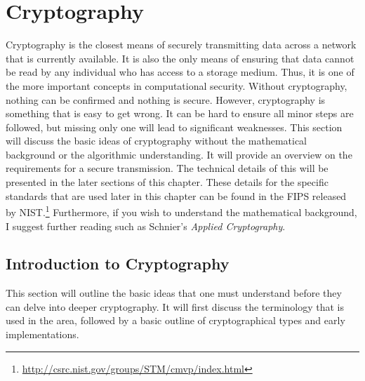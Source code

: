 \chapter{Cryptography}
	\label{ch:Cryptography}
		Cryptography is the closest means of securely transmitting data across a network that is currently available. 
		It is also the only means of ensuring that data cannot be read by any individual who has access to a storage medium. 
		Thus, it is one of the more important concepts in computational security. 
		Without cryptography, nothing can be confirmed and nothing is secure. 
		However, cryptography is something that is easy to get wrong.
		It can be hard to ensure all minor steps are followed, but missing only one will lead to significant weaknesses. 
		This section will discuss the basic ideas of cryptography without the mathematical background or the algorithmic understanding. 
		It will provide an overview on the requirements for a secure transmission. 
		The technical details of this will be presented in the later sections of this chapter. 
		These details for the specific standards that are used later in this chapter can be found in the FIPS released by NIST.\footnote{\url{http://csrc.nist.gov/groups/STM/cmvp/index.html}}
		Furthermore, if you wish to understand the mathematical background, I suggest further reading such as Schnier's \textit{Applied Cryptography}\cite{ACrypto}.
	\section{Introduction to Cryptography}
		This section will outline the basic ideas that one must understand before they can delve into deeper cryptography. 
		It will first discuss the terminology that is used in the area, followed by a basic outline of cryptographical types and early implementations. 

